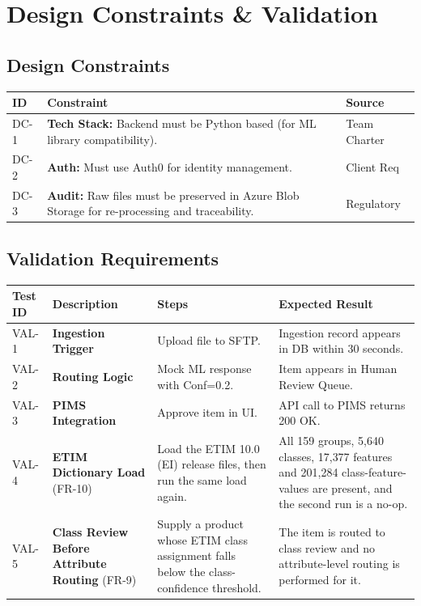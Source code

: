 \documentclass[12pt, a4paper]{article}
\begin{document}
\newpage
\section{Design Constraints \& Validation}

\subsection{Design Constraints}
\begin{tabular}{@{}l >{\raggedright\arraybackslash}p{10.5cm} >{\raggedright\arraybackslash}p{3.5cm}@{}}
\toprule
\textbf{ID} & \textbf{Constraint} & \textbf{Source} \\
\midrule
DC-1 & \textbf{Tech Stack:} Backend must be Python based (for ML library compatibility). & Team Charter \\
\addlinespace
DC-2 & \textbf{Auth:} Must use Auth0 for identity management. & Client Req \\
\addlinespace
DC-3 & \textbf{Audit:} Raw files must be preserved in Azure Blob Storage for re-processing and traceability. & Regulatory \\
\bottomrule
\end{tabular}

\subsection{Validation Requirements}
\begin{longtable}{@{}p{2cm} >{\raggedright\arraybackslash}p{3.8cm} >{\raggedright\arraybackslash}p{3.8cm} >{\raggedright\arraybackslash}p{3.8cm}@{}}
\toprule
\textbf{Test ID} & \textbf{Description} & \textbf{Steps} & \textbf{Expected Result} \\
\midrule
VAL-1 & \textbf{Ingestion Trigger} & Upload file to SFTP. & Ingestion record appears in DB within 30 seconds. \\
\addlinespace
VAL-2 & \textbf{Routing Logic} & Mock ML response with Conf=0.2. & Item appears in Human Review Queue. \\
\addlinespace
VAL-3 & \textbf{PIMS Integration} & Approve item in UI. & API call to PIMS returns 200 OK. \\
\addlinespace
VAL-4 & \textbf{ETIM Dictionary Load} (FR-10) & Load the ETIM 10.0 (EI) release files, then run the same load again. & All 159 groups, 5{,}640 classes, 17{,}377 features and 201{,}284 class-feature-values are present, and the second run is a no-op. \\
\addlinespace
VAL-5 & \textbf{Class Review Before Attribute Routing} (FR-9) & Supply a product whose ETIM class assignment falls below the class-confidence threshold. & The item is routed to class review and no attribute-level routing is performed for it. \\
\bottomrule
\end{longtable}
\end{document}
